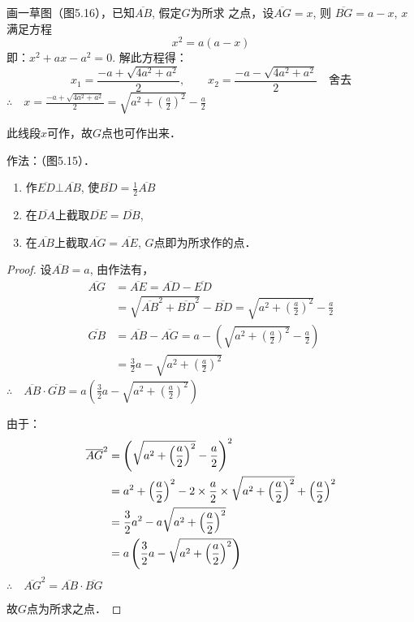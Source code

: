 \begin{analyze}
    画一草图（图5.16），已知$\overline{AB}$, 假定$G$为所求
    之点，设$\overline{AG}=x$, 则
    $\overline{BG}=a-x$,
    $x$满足方程
\[    x^2=a(a-x)\]
    即：$x^2+ax-a^2=0$. 解此方程得：
\[x_1=\frac{-a+\sqrt{4a^2+a^2}}{2},\qquad x_2=\frac{-a-\sqrt{4a^2+a^2}}{2}\quad \text{舍去}\]
$\therefore\quad x=\frac{-a+\sqrt{4a^2+a^2}}{2}=\sqrt{a^2+\left(\frac{a}{2}\right)^2}-\frac{a}{2}$

此线段$x$可作，故$G$点也可作出来．
\end{analyze}

作法：（图5.15）．
\begin{enumerate}
\item 作$\overline{ED}\bot\overline{AB}$, 使$\overline{BD}=\frac{1}{2}\overline{AB}$
\item 在$\overline{DA}$上截取$\overline{DE}=\overline{DB}$,\item 在$\overline{AB}$上截取$\overline{AG}=\overline{AE}$, $G$点即为所求作的点．
\end{enumerate}

\begin{proof}
    设$\overline{AB}=a$, 由作法有，
\[\begin{split}
    \overline{AG}&=\overline{AE}=\overline{AD}-\overline{ED}\\
&=\sqrt{\overline{AB}^2+\overline{BD}^2  }-\overline{BD}=\sqrt{a^2+\left(\frac{a}{2}\right)^2}-\frac{a}{2}\\
\overline{GB}&=\overline{AB}-\overline{AG}=a-\left(\sqrt{a^2+\left(\frac{a}{2}\right)^2}-\frac{a}{2}\right)\\
&=\frac{3}{2}a-\sqrt{a^2+\left(\frac{a}{2}\right)^2}
\end{split}\]
$\therefore\quad \overline{AB}\cdot \overline{GB}=a\left(\frac{3}{2}a-\sqrt{a^2+\left(\frac{a}{2}\right)^2}\right)$

由于：
\[\begin{split}
    \overline{AG}^2&=\left(\sqrt{a^2+\left(\dfrac{a}{2}\right)^2}-\dfrac{a}{2}\right)^2\\
&=a^2+\left(\dfrac{a}{2}\right)^2-2\times\dfrac{a}{2}\times \sqrt{a^2+\left(\dfrac{a}{2}\right)^2}+\left(\dfrac{a}{2}\right)^2\\
&=\dfrac{3}{2}a^2-a\sqrt{a^2+\left(\dfrac{a}{2}\right)^2}\\
&=a\left(\dfrac{3}{2}a-\sqrt{a^2+\left(\dfrac{a}{2}\right)^2}\right)
\end{split}
    \]
$\therefore\quad \overline{AG}^2=\overline{AB}\cdot \overline{BG}$

故$G$点为所求之点．
\end{proof}

